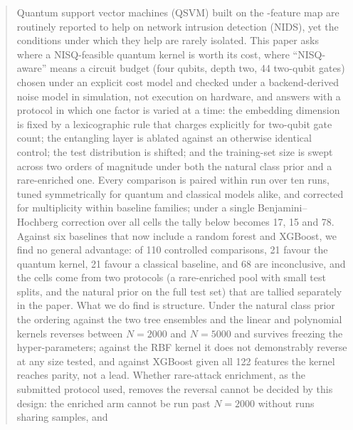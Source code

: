 \begin{abstract}
\begin{revbody}
Quantum support vector machines (QSVM) built on the \ZZ{}-feature map are
routinely reported to help on network intrusion detection (NIDS), yet the
conditions under which they help are rarely isolated. This paper asks where a
NISQ-feasible quantum kernel is worth its cost, where ``NISQ-aware'' means a
circuit budget (four qubits, depth two, 44 two-qubit gates) chosen under an
explicit cost model and checked under a backend-derived noise model in
simulation, not execution on hardware, and answers with a protocol in
which one factor is varied at a time: the embedding dimension is fixed by a
lexicographic rule that charges explicitly for two-qubit gate count; the
entangling layer is ablated against an otherwise identical control; the test
distribution is shifted; and the training-set size is swept across two orders of
magnitude under both the natural class prior and a rare-enriched one. Every
comparison is paired within run over ten runs, tuned symmetrically for quantum
and classical models alike, and corrected for multiplicity within baseline
families; under a single Benjamini--Hochberg correction over all cells the
tally below becomes 17, 15 and 78. Against six baselines that now include a
random forest and XGBoost, we find no general advantage: of 110 controlled
comparisons, 21 favour the quantum kernel, 21 favour a classical baseline, and
68 are inconclusive, and the cells come from two protocols (a rare-enriched
pool with small test splits, and the natural prior on the full test set) that
are tallied separately in the paper. What we do find is structure. Under the
natural class prior the ordering against the two tree ensembles and the linear
and polynomial kernels reverses between $N=2000$ and $N=5000$ and survives
freezing the hyper-parameters; against the RBF kernel it does not demonstrably
reverse at any size tested, and against XGBoost given all 122 features the
kernel reaches parity, not a lead. Whether rare-attack enrichment, as the
submitted protocol used, removes the reversal cannot be decided by this design:
the enriched arm cannot be run past $N=2000$ without runs sharing samples, and

\end{revbody}
\end{abstract}
